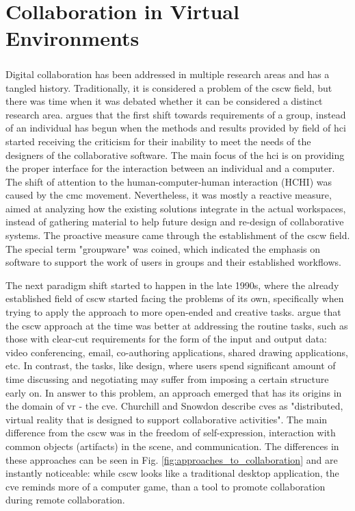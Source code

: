 \chapter{Collaboration in Virtual Environments}

\paragraph[History]{}

Digital collaboration has been addressed in multiple research areas and has a tangled history. Traditionally, it is considered a problem of the \gls{cscw} field, but there was time when it was debated whether it can be considered a distinct research area. \cite{bannon_perspectives_nodate} argues that the first shift towards requirements of a group, instead of an individual has begun when the methods and results provided by field of \gls{hci} started receiving the criticism for their inability to meet the needs of the designers of the collaborative software. The main focus of the \gls{hci} is on providing the proper interface for the interaction between an individual and a computer. The shift of attention to the human-computer-human interaction (HCHI) was caused by the \gls{cmc} movement. Nevertheless, it was mostly a reactive measure, aimed at analyzing how the existing solutions integrate in the actual workspaces, instead of gathering material to help future design and re-design of collaborative systems. The proactive measure came through the establishment of the \gls{cscw} field. The special term "groupware" was coined, which indicated the emphasis on software to support the work of users in groups and their established workflows.

The next paradigm shift started to happen in the late 1990s, where the already established field of \gls{cscw} started facing the problems of its own, specifically when trying to apply the approach to more open-ended and creative tasks. \cite{churchill_collaborative_1998} argue that the \gls{cscw} approach at the time was better at addressing the routine tasks, such as those with clear-cut requirements for the form of the input and output data: video conferencing, email, co-authoring applications, shared drawing applications, etc. In contrast, the tasks, like design, where users spend significant amount of time discussing and negotiating may suffer from imposing a certain structure early on. In answer to this problem, an approach emerged that has its origins in the domain of \gls{vr} - the \gls{cve}. Churchill and Snowdon describe \gls{cve}s as "distributed, virtual reality that is designed to support collaborative activities". The main difference from the \gls{cscw} was in the freedom of self-expression, interaction with common objects (artifacts) in the scene, and communication. The differences in these approaches can be seen in Fig. \ref{fig:approaches_to_collaboration} and are instantly noticeable: while \gls{cscw} looks like a traditional desktop application, the \gls{cve} reminds more of a computer game, than a tool to promote collaboration during remote collaboration. 

